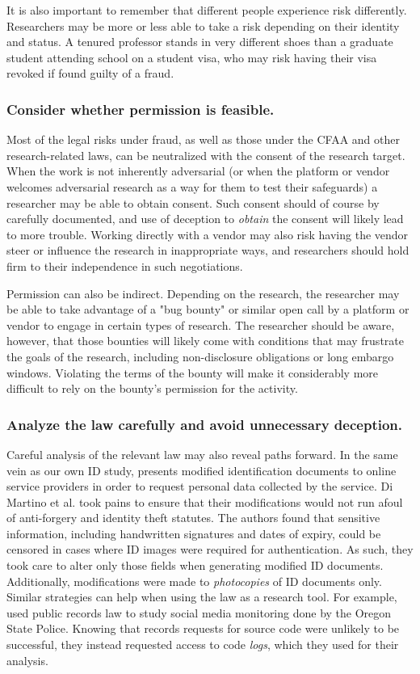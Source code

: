 It is also important to remember that different people experience risk differently. Researchers may be more or less able to take a risk depending on their identity and status. A tenured professor stands in very different shoes than a graduate student attending school on a student visa, who may risk having their visa revoked if found guilty of a fraud.

\subsubsection{Consider whether permission is feasible.}
Most of the legal risks under fraud, as well as those under the CFAA and other research-related laws, can be neutralized with the consent of the research target. When the work is not inherently adversarial (or when the platform or vendor welcomes adversarial research as a way for them to test their safeguards) a researcher may be able to obtain consent. Such consent should of course by carefully documented, and use of deception to \textit{obtain} the consent will likely lead to more trouble. Working directly with a vendor may also risk having the vendor steer or influence the research in inappropriate ways, and researchers should hold firm to their independence in such negotiations.

Permission can also be indirect. Depending on the research, the researcher may be able to take advantage of a "bug bounty" or similar open call by a platform or vendor to engage in certain types of research. The researcher should be aware, however, that those bounties will likely come with conditions that may frustrate the goals of the research, including non-disclosure obligations or long embargo windows. Violating the terms of the bounty will make it considerably more difficult to rely on the bounty's permission for the activity.

\subsubsection{Analyze the law carefully and avoid unnecessary deception.}
Careful analysis of the relevant law may also reveal paths forward. In the same vein as our own ID study, \cite{di2019personal} presents modified identification documents to online service providers in order to request personal data collected by the service. Di Martino et al. took pains to ensure that their modifications would not run afoul of anti-forgery and identity theft statutes. The authors found that sensitive information, including handwritten signatures and dates of expiry, could be censored in cases where ID images were required for authentication. As such, they took care to alter only those fields when generating modified ID documents. Additionally, modifications were made to \textit{photocopies} of ID documents only. Similar strategies can help when using the law as a research tool. For example, \cite{borradaile2020whose} used public records law to study social media monitoring done by the Oregon State Police. Knowing that records requests for source code were unlikely to be successful, they instead requested access to code \textit{logs}, which they used for their analysis. 

